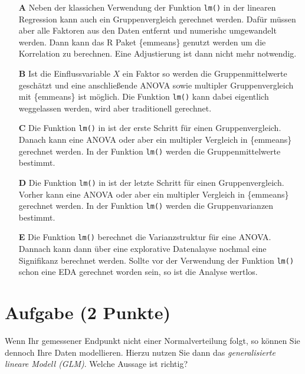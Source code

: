 \documentclass[a4paper, 9pt]{scrartcl}\usepackage[]{graphicx}\usepackage[]{xcolor}
\begin{document}
\begin{enumerate}
\item [\textbf{A} \msquare] Neben der klassichen Verwendung der Funktion \texttt{lm()} in der linearen Regression kann auch ein Gruppenvergleich gerechnet werden. Dafür müssen aber alle Faktoren aus den Daten entfernt und numerishc umgewandelt werden. Dann kann das R Paket \{emmeans\} genutzt werden um die Korrelation zu berechnen. Eine Adjustierung ist dann nicht mehr notwendig.
\item [\textbf{B} \msquare] Ist die Einflussvariable $X$ ein Faktor so werden die Gruppenmittelwerte geschätzt und eine anschließende ANOVA sowie multipler Gruppenvergleich mit \{emmeans\} ist möglich. Die Funktion \texttt{lm()} kann dabei eigentlich weggelassen werden, wird aber traditionell gerechnet.
\item [\textbf{C} \msquare] Die Funktion \texttt{lm()} in \Rlogo ist der erste Schritt für einen Gruppenvergleich. Danach kann eine ANOVA oder aber ein multipler Vergleich in \{emmeans\} gerechnet werden. In der Funktion  \texttt{lm()} werden die Gruppenmittelwerte bestimmt.
\item [\textbf{D} \msquare] Die Funktion \texttt{lm()} in \Rlogo ist der letzte Schritt für einen Gruppenvergleich. Vorher kann eine ANOVA oder aber ein multipler Vergleich in \{emmeans\} gerechnet werden. In der Funktion  \texttt{lm()} werden die Gruppenvarianzen bestimmt.
\item [\textbf{E} \msquare] Die Funktion \texttt{lm()} berechnet die Varianzstruktur für eine ANOVA. Dannach kann dann über eine explorative Datenalayse nochmal eine Signifikanz berechnet werden. Sollte vor der Verwendung der Funktion \texttt{lm()} schon eine EDA gerechnet worden sein, so ist die Analyse wertlos.
\end{enumerate}

\section{Aufgabe \hfill (2 Punkte)}



Wenn Ihr gemessener Endpunkt nicht einer Normalverteilung folgt, so können Sie dennoch Ihre Daten modellieren. Hierzu nutzen Sie dann das \textit{generalisierte lineare Modell (GLM)}. Welche Aussage ist richtig?
\end{document}
